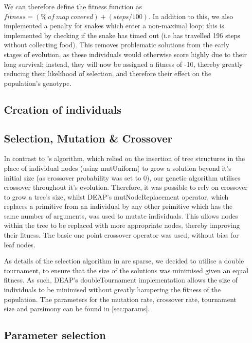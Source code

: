 \documentclass[british,10pt,a4paper]{article}
\begin{document}
We can therefore define the fitness function as \(fitness= (\% \ of\ map\ covered) + (steps/100)\). \newline
In addition to this, we also implemented a penalty for snakes which enter a non-maximal loop: this is implemented by checking if the snake has timed out (i.e has travelled 196 steps without collecting food). This removes problematic solutions from the early stages of evolution, as these individuals would otherwise score highly due to their long survival; instead, they will now be assigned a fitness of -10, thereby greatly reducing their likelihood of selection, and therefore their effect on the population's genotype.

\subsection{Creation of individuals}
\subsection{Selection, Mutation \& Crossover}
In contrast to \citeauthor{Ehlis2000-sz}'s algorithm, which relied on the insertion of tree structures in the place of individual nodes (using mutUniform)  to grow a solution beyond it's initial size (as crossover probability was set to 0), our genetic algorithm utilises crossover throughout it's evolution. Therefore, it was possible to rely on crossover to grow a tree's size, whilst DEAP's mutNodeReplacement operator, which replaces a primitive from an individual by any other primitive which has the same number of arguments, was used to mutate individuals. This allows nodes within the tree to be replaced with more appropriate nodes, thereby improving their fitness. The basic one point crossover operator was used, without bias for leaf nodes. \newline

As details of the selection algorithm in \cite{Ehlis2000-sz} are sparse, we decided to utilise a double tournament, to ensure that the size of the solutions was minimised given an equal fitness. As such, DEAP's doubleTournament implementation allows the size of individuals to be minimised without greatly hampering the fitness of the population. The parameters for the mutation rate, crossover rate, tournament size and parsimony can be found in \autoref{sec:params}.\newline

\subsection{Parameter selection}
\label{sec:params}
\end{document}
